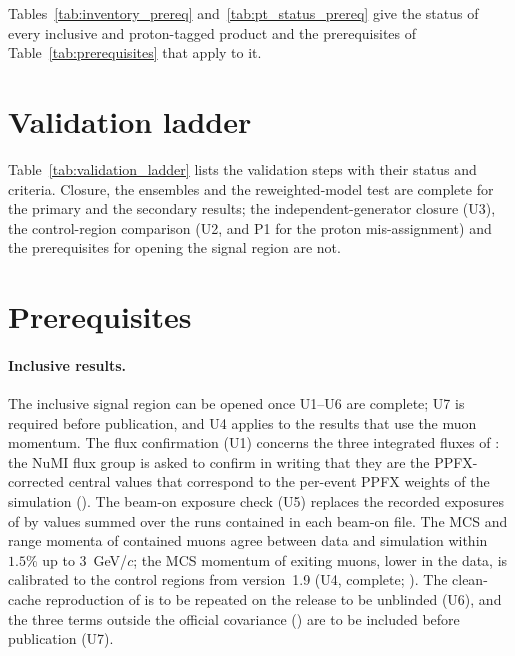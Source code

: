 Tables~\ref{tab:inventory_prereq} and~\ref{tab:pt_status_prereq} give the status of every inclusive and
proton-tagged product and the prerequisites of Table~\ref{tab:prerequisites} that apply to it.





\section{Validation ladder}
\label{sec:ar_ladder}

Table~\ref{tab:validation_ladder} lists the validation steps with their status and criteria. Closure, the
ensembles and the reweighted-model test are complete for the primary and the secondary results; the
independent-generator closure (U3), the control-region comparison (U2, and P1 for the proton
mis-assignment) and the prerequisites for opening the signal region are not.



\section{Prerequisites}
\label{sec:ar_prereq}

\paragraph{Inclusive results.} The inclusive signal region can be opened once U1--U6 are complete; U7 is
required before publication, and U4 applies to the results that use the muon momentum. The flux
confirmation (U1) concerns the three integrated fluxes of : the NuMI flux group
is asked to confirm in writing that they are the PPFX-corrected central values that correspond to the
per-event PPFX weights of the simulation (). The beam-on exposure check
(U5) replaces the recorded exposures of  by values summed over the runs contained
in each beam-on file. The MCS and range momenta of contained muons agree between data and simulation
within $1.5\%$ up to $3$~GeV/$c$; the MCS momentum of exiting muons, lower in the data, is calibrated to the control
regions from version~1.9 (U4, complete; ). The
clean-cache reproduction of  is to be repeated on the release to be unblinded
(U6), and the three terms outside the official covariance () are to be
included before publication (U7).

